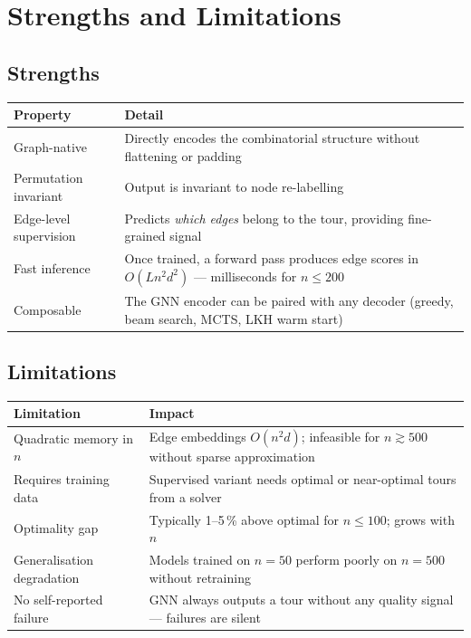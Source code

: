 \documentclass[12pt,a4paper]{article}
\begin{document}
\section{Strengths and Limitations}

\subsection*{Strengths}

\begin{center}
\begin{tabularx}{\linewidth}{lX}
\toprule
\textbf{Property} & \textbf{Detail} \\
\midrule
Graph-native & Directly encodes the combinatorial structure without
  flattening or padding \\
Permutation invariant & Output is invariant to node re-labelling \\
Edge-level supervision & Predicts \textit{which edges} belong to the tour,
  providing fine-grained signal \\
Fast inference & Once trained, a forward pass produces edge scores in
  $O(Ln^2d^2)$ --- milliseconds for $n \leq 200$ \\
Composable & The GNN encoder can be paired with any decoder
  (greedy, beam search, MCTS, LKH warm start) \\
\bottomrule
\end{tabularx}
\end{center}

\subsection*{Limitations}

\begin{center}
\begin{tabularx}{\linewidth}{lX}
\toprule
\textbf{Limitation} & \textbf{Impact} \\
\midrule
Quadratic memory in $n$ & Edge embeddings $O(n^2 d)$; infeasible for
  $n \gtrsim 500$ without sparse approximation \\
Requires training data & Supervised variant needs optimal or near-optimal
  tours from a solver \\
Optimality gap & Typically 1--5\,\% above optimal for $n \leq 100$;
  grows with $n$ \\
Generalisation degradation & Models trained on $n = 50$ perform poorly
  on $n = 500$ without retraining \\
No self-reported failure & GNN always outputs a tour without any quality
  signal --- failures are silent \\
\bottomrule
\end{tabularx}
\end{center}
\end{document}
